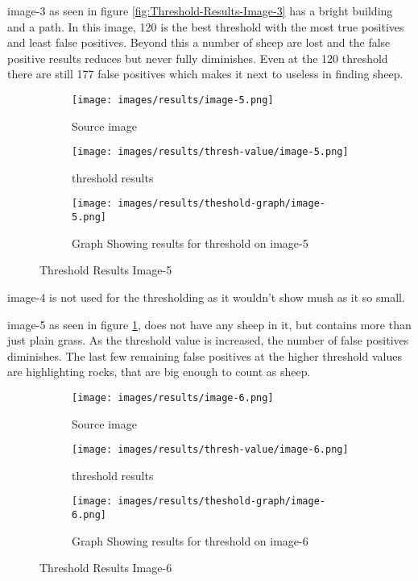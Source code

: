 image-3 as seen in figure \ref{fig:Threshold-Results-Image-3} has a bright building and a path. In this image,
120 is the best threshold with the most true positives and least false positives. Beyond this a number of sheep are lost and the false positive results reduces but never fully diminishes. Even at the 120 threshold there are still 177 false positives which makes it next to useless in finding sheep.

\begin{figure}[H]
    \centering

\begin{subfigure}{.5\textwidth}
    \centering
    \texttt{[image: images/results/image-5.png]}
    \caption{Source image}

\end{subfigure}%
\begin{subfigure}{.5\textwidth}
\centering
    \texttt{[image: images/results/thresh-value/image-5.png]}
    \caption{threshold results}

\end{subfigure}
\begin{subfigure}{.9\textwidth}
\centering
    \texttt{[image: images/results/theshold-graph/image-5.png]}
    \caption{Graph Showing results for threshold on image-5}
\end{subfigure}%

    \caption{Threshold Results Image-5}
    \label{fig:Threshold-Results-Image-5}
\end{figure}

image-4 is not used for the thresholding as it wouldn't show mush as it so small.

image-5 as seen in figure \ref{fig:Threshold-Results-Image-5}, does not have any sheep in it, but contains more than just plain grass. As the threshold value is increased, the number of false positives diminishes. The last few remaining false positives at the higher threshold values are highlighting rocks, that are big enough to count as sheep.

\begin{figure}[H]
    \centering

\begin{subfigure}{.5\textwidth}
    \centering
    \texttt{[image: images/results/image-6.png]}
    \caption{Source image}

\end{subfigure}%
\begin{subfigure}{.5\textwidth}
\centering
    \texttt{[image: images/results/thresh-value/image-6.png]}
    \caption{threshold results}

\end{subfigure}
\begin{subfigure}{.9\textwidth}
\centering
    \texttt{[image: images/results/theshold-graph/image-6.png]}
    \caption{Graph Showing results for threshold on image-6}
\end{subfigure}%

    \caption{Threshold Results Image-6}
    \label{fig:Threshold-Results-Image-6}
\end{figure}

